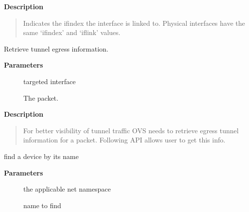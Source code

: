 \documentclass[a4paper,8pt,english]{sphinxmanual}
\begin{document}
\textbf{Description}
\begin{quote}

Indicates the ifindex the interface is linked to.
Physical interfaces have the same `ifindex' and `iflink' values.
\end{quote}

\begin{fulllineitems}
\label{networking/kapi:c.dev_fill_metadata_dst}
Retrieve tunnel egress information.

\end{fulllineitems}


\textbf{Parameters}
\begin{description}
\item[{}] \leavevmode
targeted interface

\item[{}] \leavevmode
The packet.

\end{description}

\textbf{Description}
\begin{quote}

For better visibility of tunnel traffic OVS needs to retrieve
egress tunnel information for a packet. Following API allows
user to get this info.
\end{quote}

\begin{fulllineitems}
\label{networking/kapi:c.__dev_get_by_name}
find a device by its name

\end{fulllineitems}


\textbf{Parameters}
\begin{description}
\item[{}] \leavevmode
the applicable net namespace

\item[{}] \leavevmode
name to find

\end{description}
\end{document}
